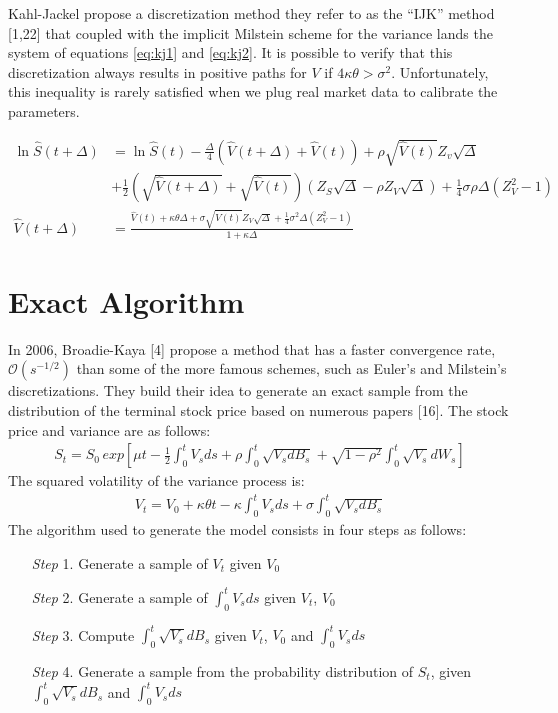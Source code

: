 \documentclass[12pt,twoside]{reedthesis}
\theoremstyle{definition}
\theoremstyle{definition}
\theoremstyle{remark}
\begin{document}
  Kahl-Jackel propose a discretization method they refer to as the ``IJK''
  method {[}1,22{]} that coupled with the implicit Milstein scheme for the
  variance lands the system of equations \eqref{eq:kj1} and \eqref{eq:kj2}. It
  is possible to verify that this discretization always results in
  positive paths for \(V\) if \(4 \kappa \theta > \sigma^2\).
  Unfortunately, this inequality is rarely satisfied when we plug real
  market data to calibrate the parameters.
  \begin{small}
  \begin{align}
  \label{eq:kj1}
  \ln \hat{S}(t + \Delta) &= \ln \hat{S}(t) - \frac{\Delta}{4}\left( \hat{V}(t+\Delta) + \hat{V}(t) \right) + \rho \sqrt{\hat{V}(t)}Z_v\sqrt{\Delta} \\ \nonumber
  &+ \frac{1}{2} \left( \sqrt{\hat{V}(t+\Delta)} + \sqrt{\hat{V}(t)} \right) \left( Z_S \sqrt{\Delta} - \rho Z_V \sqrt{\Delta}\right) + \frac{1}{4} \sigma \rho \Delta \left( Z_{V}^{2} - 1 \right) \\
  \label{eq:kj2}
  \hat{V}(t+\Delta) &= \frac{\hat{V}(t) + \kappa \theta \Delta + \sigma \sqrt{\hat{V}(t)}Z_V \sqrt{\Delta}+ \frac{1}{4}\sigma^2 \Delta \left(Z_V^2-1 \right)}{1+ \kappa \Delta}
  \end{align}
  \end{small}
  \section{Exact Algorithm}\label{exact-algorithm}
  
  In 2006, Broadie-Kaya {[}4{]} propose a method that has a faster
  convergence rate, \(\mathcal{O} \left( s^{-1/2} \right)\) than some of
  the more famous schemes, such as Euler's and Milstein's discretizations.
  They build their idea to generate an exact sample from the distribution
  of the terminal stock price based on numerous papers {[}16{]}. The stock
  price and variance are as follows:
  \begin{align} \label{eq:ea1}
  S_t = S_0 \, exp \left[ \mu t - \frac{1}{2} \int_{0}^{t}{V_s ds} + \rho  \int_{0}^{t}{\sqrt{V_s d B_s}} + \sqrt{1 - \rho^2} \int_{0}^{t}{\sqrt{V_s} dW_s}\right]
  \end{align}
  The squared volatility of the variance process is:
  \begin{align} \label{eq:ea2}
  V_t = V_0 + \kappa \theta t - \kappa \int_{0}^{t}{V_s ds} + \sigma \int_{0}^{t}{\sqrt{V_s dB_s}}
  \end{align}
  The algorithm used to generate the model consists in four steps as
  follows:
  \begin{itemize}
  \item [\textit{Step} 1.] Generate a sample of $V_t$ given $V_0$
  \item [\textit{Step} 2.] Generate a sample of $\int_0^t V_sds$ given $V_t$, $V_0$
  \item [\textit{Step} 3.] Compute $\int_0^t \sqrt{V_s}dB_s$ given $V_t$, $V_0$ and $\int_0^t V_sds$
  \item [\textit{Step} 4.] Generate a sample from the probability distribution of $S_t$, given $\int_0^t \sqrt{V_s}dB_s$ and $\int_0^t V_sds$
  \end{itemize}
\end{document}
